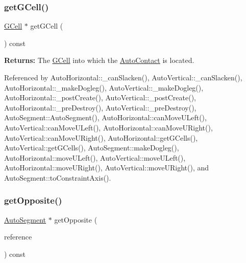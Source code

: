 \subsubsection{\texorpdfstring{get\+G\+Cell()}{getGCell()}}
{\footnotesize\ttfamily \mbox{\hyperlink{classKatabatic_1_1GCell}{G\+Cell}} $\ast$ get\+G\+Cell (\begin{DoxyParamCaption}{ }\end{DoxyParamCaption}) const\hspace{0.3cm}{\ttfamily [inline]}}

{\bfseries Returns\+:} The \mbox{\hyperlink{classKatabatic_1_1GCell}{G\+Cell}} into which the \mbox{\hyperlink{classKatabatic_1_1AutoContact}{Auto\+Contact}} is located. 

Referenced by Auto\+Horizontal\+::\+\_\+can\+Slacken(), Auto\+Vertical\+::\+\_\+can\+Slacken(), Auto\+Horizontal\+::\+\_\+make\+Dogleg(), Auto\+Vertical\+::\+\_\+make\+Dogleg(), Auto\+Horizontal\+::\+\_\+post\+Create(), Auto\+Vertical\+::\+\_\+post\+Create(), Auto\+Horizontal\+::\+\_\+pre\+Destroy(), Auto\+Vertical\+::\+\_\+pre\+Destroy(), Auto\+Segment\+::\+Auto\+Segment(), Auto\+Horizontal\+::can\+Move\+U\+Left(), Auto\+Vertical\+::can\+Move\+U\+Left(), Auto\+Horizontal\+::can\+Move\+U\+Right(), Auto\+Vertical\+::can\+Move\+U\+Right(), Auto\+Horizontal\+::get\+G\+Cells(), Auto\+Vertical\+::get\+G\+Cells(), Auto\+Segment\+::make\+Dogleg(), Auto\+Horizontal\+::move\+U\+Left(), Auto\+Vertical\+::move\+U\+Left(), Auto\+Horizontal\+::move\+U\+Right(), Auto\+Vertical\+::move\+U\+Right(), and Auto\+Segment\+::to\+Constraint\+Axis().

\mbox{\label{classKatabatic_1_1AutoContact_a48ab1d3bdf85712e4784ef83ef136939}} 
\subsubsection{\texorpdfstring{get\+Opposite()}{getOpposite()}}
{\footnotesize\ttfamily \mbox{\hyperlink{classKatabatic_1_1AutoSegment}{Auto\+Segment}} $\ast$ get\+Opposite (\begin{DoxyParamCaption}\item[{const \mbox{\hyperlink{classKatabatic_1_1AutoSegment}{Auto\+Segment}} $\ast$}]{reference }\end{DoxyParamCaption}) const\hspace{0.3cm}{\ttfamily [pure virtual]}}

